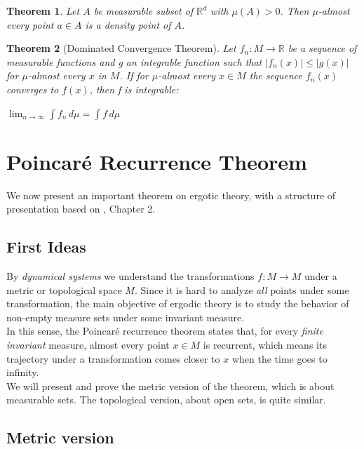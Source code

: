 \documentclass[a4paper,12pt] {article}
\newtheorem{theorem}{Theorem}[section]
\begin{document}
\begin{theorem}
  Let $A$ be measurable subset of $\mathbb{R}^{d}$ with $\mu(A) > 0$. Then $\mu$-almost every point $a \in A$ is a density point of $A$.
\end{theorem}

\begin{theorem}[Dominated Convergence Theorem]
Let $f_n : M \to \mathbb{R}$ be a sequence of measurable functions and g an integrable function such that $|f_n(x)| \leq |g(x)|$ for $\mu$-almost every $x$ in $M$. If for $\mu$-almost every $x \in M$ the sequence $f_n(x)$ converges to $f(x)$, then f is integrable:
\begin{center}
    $\displaystyle \lim_{n \to \infty} \displaystyle \int f_n\, d\mu = \int f\, d\mu$
\end{center}
\end{theorem}

\section{Poincaré Recurrence Theorem}

We now present an important theorem on ergotic theory, with a structure of presentation based on \cite{Krerley}, Chapter 2.

\subsection{First Ideas}

By \textit{dynamical systems} we understand the transformations $f : M \to M$ under a metric or topological space $M$. Since it is hard to analyze \textit{all} points under some transformation, the main objective of ergodic theory is to study the  behavior of non-empty measure sets under some invariant measure.\\

 In this sense, the Poincaré recurrence theorem states that, for every \textit{finite invariant} measure, almost every point $x \in M$ is recurrent, which means its trajectory under a transformation comes closer to $x$ when the time goes to infinity.\\

 We will present and prove the metric version of the theorem, which is about measurable sets. The topological version, about open sets, is quite similar.

\subsection{Metric version}
\end{document}
